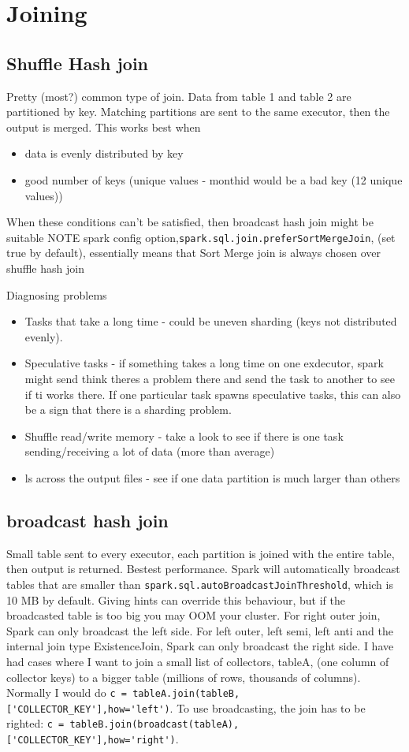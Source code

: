 \documentclass{article}
\begin{document}
\section{Joining}
    

    \subsection{Shuffle Hash join}
    Pretty (most?) common type of join. Data from table 1 and table 2 are partitioned by key. Matching partitions are sent to the same executor, then the output is merged.
    This works best when
    \begin{itemize}
        \item data is evenly distributed by key
        \item good number of keys (unique values - monthid would be a bad key (12 unique values))
    \end{itemize}
    When these conditions can't be satisfied, then broadcast hash join might be suitable
    NOTE spark config option,\verb|spark.sql.join.preferSortMergeJoin|, (set true by default), essentially means that Sort Merge join is always chosen over shuffle hash join


    Diagnosing problems
    \begin{itemize}
        \item Tasks that take a long time - could be uneven sharding (keys not distributed evenly).
        \item Speculative tasks - if something takes a long time on one exdecutor, spark might send think theres a problem there and send the task to another to see if ti works there. If one particular task spawns speculative tasks, this can also be a sign that there is a sharding problem.
        \item Shuffle read/write memory - take a look to see if there is one task sending/receiving a lot of data (more than average)
        \item ls across the output files - see if one data partition is much larger than others
    \end{itemize}

    \subsection{broadcast hash join}
    Small table sent to every executor, each partition is joined with the entire table, then output is returned. Bestest performance. Spark will automatically broadcast tables that are smaller than \verb|spark.sql.autoBroadcastJoinThreshold|, which is 10 MB by default. Giving hints can override this behaviour, but if the broadcasted table is too big you may OOM your cluster.
    For right outer join, Spark can only broadcast the left side. For left outer, left semi, left anti and the internal join type ExistenceJoin, Spark can only broadcast the right side. I have had cases where I want to join a small list of collectors, tableA, (one column of collector keys) to a bigger table (millions of rows, thousands of columns). Normally I would do \verb|c = tableA.join(tableB,['COLLECTOR_KEY'],how='left')|. To use broadcasting, the join has to be righted: \verb|c = tableB.join(broadcast(tableA),['COLLECTOR_KEY'],how='right')|. 
\end{document}
